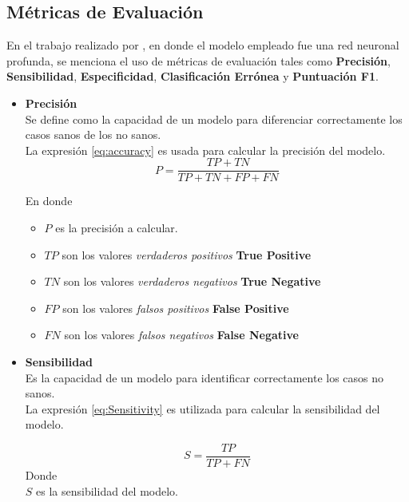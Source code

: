     \subsection{Métricas de Evaluación}
    En el trabajo realizado por \citet[p. 732]{bib6}, en donde el modelo empleado fue una red neuronal profunda, se menciona el uso de métricas de evaluación tales como \textbf{Precisión}, \textbf{Sensibilidad}, \textbf{Especificidad}, \textbf{Clasificación Errónea} y \textbf{Puntuación F1}.\\

    \begin{itemize}
        \item \textbf{Precisión}\\
        Se define como la capacidad de un modelo para diferenciar correctamente los casos sanos de los no sanos.\\

        La expresión \ref{eq:accuracy} es usada para calcular la precisión del modelo.
        \begin{equation}
            P = \frac{TP + TN}{TP + TN + FP + FN}
            \label{eq:accuracy}
        \end{equation}

        En donde
        \begin{itemize}
            \item $P$ es la precisión a calcular.
            \item $TP$ son los valores \textit{verdaderos positivos} \textbf{True Positive}
            \item $TN$ son los valores \textit{verdaderos negativos} \textbf{True Negative}
            \item $FP$ son los valores \textit{falsos positivos} \textbf{False Positive}
            \item $FN$ son los valores \textit{falsos negativos} \textbf{False Negative}
        \end{itemize}

    \item \textbf{Sensibilidad}\\
        Es la capacidad de un modelo para identificar correctamente los casos no sanos.\\

        La expresión \ref{eq:Sensitivity} es utilizada para calcular la sensibilidad del modelo.
        
        \begin{equation}
            S = \frac{TP}{TP + FN}
            \label{eq:Sensitivity}
        \end{equation}
        Donde\\ 
        \noindent
        $S$ es la sensibilidad del modelo.


\end{itemize}
